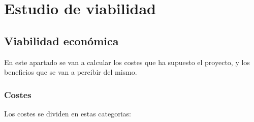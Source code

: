 \section{Estudio de viabilidad}

\subsection{Viabilidad económica}

En este apartado se van a calcular los costes que ha supuesto el proyecto, y los beneficios que se van a percibir del mismo.

\subsubsection{Costes}

Los costes se dividen en estas categorias:

